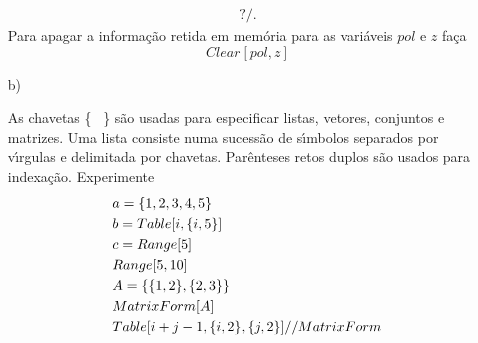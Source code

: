 \documentclass[11pt]{article}
\begin{document}
\begin{itemize}
\[\begin{array}{l}
?/.

 \end{array}
\]
Para apagar a informa\c{c}\~ao retida em mem\'oria para as vari\'aveis $pol$ e $z$   fa\c{c}a
\[
 Clear[pol,z]
 \]
 
 

 
 \item[b)] 
 
 As chavetas \{ \ \} s\~ao usadas para especificar listas, vetores, conjuntos e matrizes. Uma lista consiste numa sucess\~ao de s\'\i mbolos separados por v\'\i rgulas e delimitada por chavetas.  Par\^enteses retos duplos s\~ao usados para indexa\c{c}\~ao.  Experimente
  \[\begin{array}{l}
a = \{1, 2, 3, 4, 5\}

     \vspace{1mm}
\\
 
 b = Table[i, \{i, 5\}]
 
 
      \vspace{1mm}
\\

 c = Range[5]
 
       \vspace{1mm}
\\
 





Range[5, 10]
 
         \vspace{1mm}
\\

A = \{\{1, 2\}, \{2, 3\}\}

         \vspace{1mm}
\\

MatrixForm[A]

         \vspace{1mm}
\\

Table[i + j - 1, \{i, 2\}, \{j, 2\}] // MatrixForm


\end{array}\]
\end{itemize}
\end{document}
